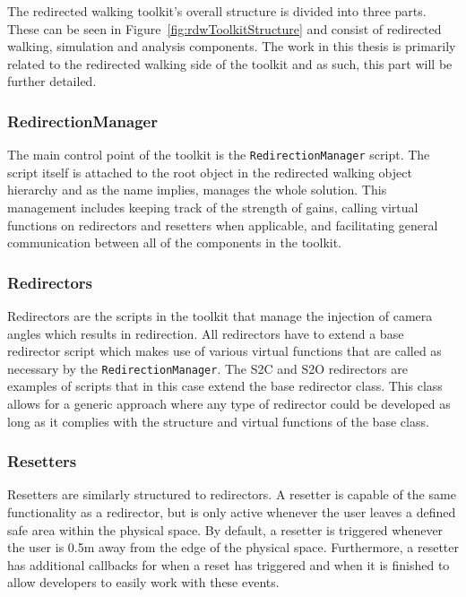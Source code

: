 The redirected walking toolkit's overall structure is divided into three parts. These can be seen in Figure~\ref{fig:rdwToolkitStructure} and consist of redirected walking, simulation and analysis components. The work in this thesis is primarily related to the redirected walking side of the toolkit and as such, this part will be further detailed. 

\subsubsection{RedirectionManager}
The main control point of the toolkit is the \lstinline{RedirectionManager} script. The script itself is attached to the root object in the redirected walking object hierarchy and as the name implies, manages the whole solution. This management includes keeping track of the strength of gains, calling virtual functions on redirectors and resetters when applicable, and facilitating general communication between all of the components in the toolkit. 

\subsubsection{Redirectors}
Redirectors are the scripts in the toolkit that manage the injection of camera angles which results in redirection. All redirectors have to extend a base redirector script which makes use of various virtual functions that are called as necessary by the \lstinline{RedirectionManager}. The S2C and S2O redirectors are examples of scripts that in this case extend the base redirector class. This class allows for a generic approach where any type of redirector could be developed as long as it complies with the structure and virtual functions of the base class. 

\subsubsection{Resetters}
Resetters are similarly structured to redirectors. A resetter is capable of the same functionality as a redirector, but is only active whenever the user leaves a defined safe area within the physical space. By default, a resetter is triggered whenever the user is 0.5m away from the edge of the physical space. Furthermore, a resetter has additional callbacks for when a reset has triggered and when it is finished to allow developers to easily work with these events. 

